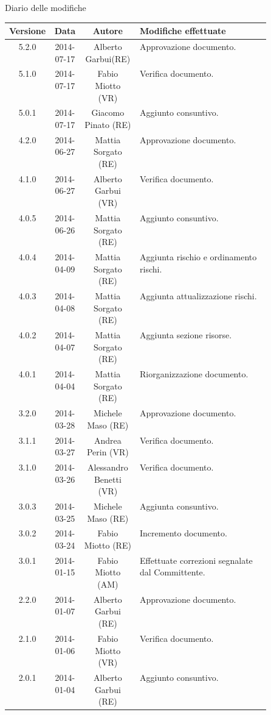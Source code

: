 
\newpage
Diario delle modifiche
\begin{center}
\begin{longtable}{|c|c|c|p{0.5\linewidth}|}
\toprule
\textbf{Versione} & \textbf{Data} & \textbf{Autore} & \textbf{Modifiche effettuate}\\

\midrule
5.2.0 & 2014-07-17 & Alberto Garbui(RE) & Approvazione documento.\\
\midrule
5.1.0 & 2014-07-17 & Fabio Miotto (VR) & Verifica documento.\\
\midrule
5.0.1 & 2014-07-17 & Giacomo Pinato (RE) & Aggiunto consuntivo.\\

\midrule
4.2.0 & 2014-06-27 & Mattia Sorgato (RE) & Approvazione documento.\\
\midrule
4.1.0 & 2014-06-27 & Alberto Garbui (VR) & Verifica documento.\\
\midrule
4.0.5 & 2014-06-26 & Mattia Sorgato (RE) & Aggiunto consuntivo.\\
\midrule
4.0.4 & 2014-04-09 & Mattia Sorgato (RE) & Aggiunta rischio e ordinamento rischi.\\
\midrule
4.0.3 & 2014-04-08 & Mattia Sorgato (RE) & Aggiunta attualizzazione rischi.\\
\midrule
4.0.2 & 2014-04-07 & Mattia Sorgato (RE) & Aggiunta sezione risorse.\\
\midrule
4.0.1 & 2014-04-04 & Mattia Sorgato (RE) & Riorganizzazione documento.\\

\midrule
3.2.0 & 2014-03-28 & Michele Maso (RE) & Approvazione documento.\\
\midrule
3.1.1 & 2014-03-27 & Andrea Perin (VR) & Verifica documento.\\
\midrule
3.1.0 & 2014-03-26 & Alessandro Benetti (VR) & Verifica documento.\\
\midrule
3.0.3 & 2014-03-25 & Michele Maso (RE) & Aggiunta consuntivo.\\
\midrule
3.0.2 & 2014-03-24 & Fabio Miotto (RE) & Incremento documento.\\
\midrule
3.0.1 & 2014-01-15 & Fabio Miotto (AM) & Effettuate correzioni segnalate dal Committente.\\

\midrule
2.2.0 & 2014-01-07 & Alberto Garbui (RE) & Approvazione documento.\\
\midrule
2.1.0 & 2014-01-06 & Fabio Miotto (VR) & Verifica documento.\\
\midrule
2.0.1 & 2014-01-04 & Alberto Garbui (RE) & Aggiunto consuntivo.\\


\end{longtable}
\end{center}
